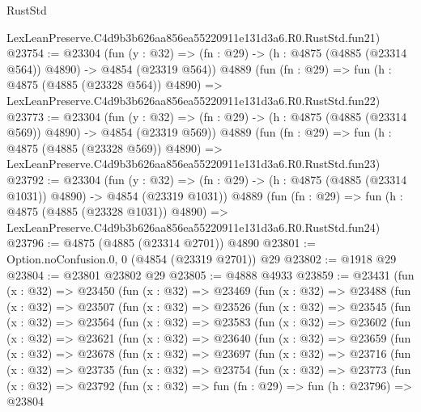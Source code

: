 \begin{lexlean}{RustStd}
\begin{coremodule}
    LexLeanPreserve.C4d9b3b626aa856ea55220911e131d3a6.R0.RustStd.fun21)
@23754 := @23304
    (fun (y : @32) => (fn : @29) -> (h : @4875 (@4885 (@23314 @564)) @4890) -> @4854 (@23319 @564))
    @4889
    (fun (fn : @29) =>
    fun (h : @4875 (@4885 (@23328 @564)) @4890) =>
    LexLeanPreserve.C4d9b3b626aa856ea55220911e131d3a6.R0.RustStd.fun22)
@23773 := @23304
    (fun (y : @32) => (fn : @29) -> (h : @4875 (@4885 (@23314 @569)) @4890) -> @4854 (@23319 @569))
    @4889
    (fun (fn : @29) =>
    fun (h : @4875 (@4885 (@23328 @569)) @4890) =>
    LexLeanPreserve.C4d9b3b626aa856ea55220911e131d3a6.R0.RustStd.fun23)
@23792 := @23304
    (fun (y : @32) =>
    (fn : @29) -> (h : @4875 (@4885 (@23314 @1031)) @4890) -> @4854 (@23319 @1031))
    @4889
    (fun (fn : @29) =>
    fun (h : @4875 (@4885 (@23328 @1031)) @4890) =>
    LexLeanPreserve.C4d9b3b626aa856ea55220911e131d3a6.R0.RustStd.fun24)
@23796 := @4875 (@4885 (@23314 @2701)) @4890
@23801 := Option.noConfusion.{0, 0} (@4854 (@23319 @2701)) @29
@23802 := @1918 @29
@23804 := @23801 @23802 @29
@23805 := @4888 @4933
@23859 := @23431
    (fun (x : @32) =>
    @23450
      (fun (x : @32) =>
      @23469
        (fun (x : @32) =>
        @23488
          (fun (x : @32) =>
          @23507
            (fun (x : @32) =>
            @23526
              (fun (x : @32) =>
              @23545
                (fun (x : @32) =>
                @23564
                  (fun (x : @32) =>
                  @23583
                    (fun (x : @32) =>
                    @23602
                      (fun (x : @32) =>
                      @23621
                        (fun (x : @32) =>
                        @23640
                          (fun (x : @32) =>
                          @23659
                            (fun (x : @32) =>
                            @23678
                              (fun (x : @32) =>
                              @23697
                                (fun (x : @32) =>
                                @23716
                                  (fun (x : @32) =>
                                  @23735
                                    (fun (x : @32) =>
                                    @23754
                                      (fun (x : @32) =>
                                      @23773
                                        (fun (x : @32) =>
                                        @23792
                                          (fun (x : @32) =>
                                          fun (fn : @29) =>
                                          fun (h : @23796) =>
                                          @23804

\end{coremodule}
\end{lexlean}
